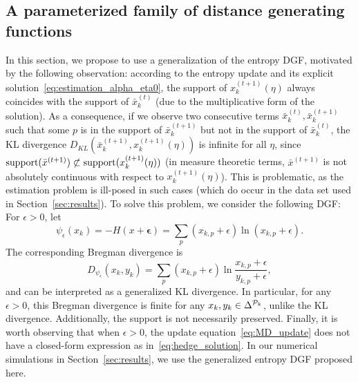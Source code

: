 \documentclass{sig-alternate-ipsn13}
\begin{document}
\subsection{A parameterized family of distance generating functions}
\label{subsec:reg_entropy}
In this section, we propose to use a generalization of the entropy DGF, motivated by the following observation:
according to the entropy update and its explicit solution~\eqref{eq:estimation_alpha_eta0}, the support of $x^{(t+1)}_k(\eta)$ always coincides with the support of $\bar x^{(t)}_k$ (due to the multiplicative form of the solution). As a consequence, if we observe two consecutive terms $\bar x^{(t)}_k, \bar x^{(t+1)}_k$ such that some $p$ is in the support of $\bar x^{(t+1)}_k$ but not in the support of $\bar x^{(t)}_k$, the KL divergence $D_{KL}(\bar x^{(t+1)}_k, x^{(t+1)}_k(\eta))$ is infinite for all $\eta$, since $\operatorname*{support} (\bar x^{(t+1)}) \not\subset \operatorname*{support} (x^{(t+1)}_k(\eta))$ (in measure theoretic terms, $\bar x^{(t+1)}$ is not absolutely continuous with respect to $x^{(t+1)}_k(\eta)$). This is problematic, as the estimation problem is ill-posed in such cases (which do occur in the data set used in Section~\ref{sec:results}). To solve this problem, we consider the following DGF: For $\epsilon > 0$, let
\[
\psi_\epsilon(x_k) = -H(x+\mathbf \epsilon) = \sum_p (x_{k, p} + \epsilon) \ln (x_{k,p} + \epsilon).
\]
The corresponding Bregman divergence is
\[
D_{\psi_\epsilon}(x_k, y_k) = \sum_p (x_{k,p}+\epsilon)\ln\frac{x_{k, p} + \epsilon}{y_{k, p} + \epsilon},
\]
and can be interpreted as a generalized KL divergence. In particular, for any $\epsilon > 0$, this Bregman divergence is finite for any $x_k, y_k \in \Delta^{\mathcal{P}_k}$, unlike the KL divergence. Additionally, the support is not necessarily preserved. Finally, it is worth observing that when $\epsilon > 0$, the update equation~\eqref{eq:MD_update} does not have a closed-form expression as in~\eqref{eq:hedge_solution}. In our numerical simulations in Section~\ref{sec:results}, we use the generalized entropy DGF proposed here.




\end{document}
